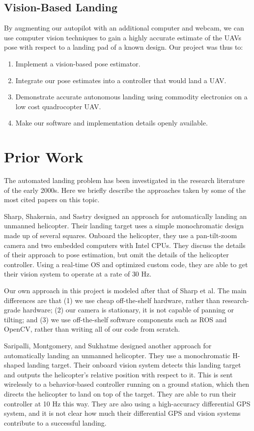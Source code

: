\documentclass[10pt]{scrartcl} %
\begin{document}
\subsection{Vision-Based Landing}
By augmenting our autopilot with an additional computer and webcam, we can use computer vision techniques to gain a highly accurate estimate of the UAVs pose with respect to a landing pad of a known design.
Our project was thus to:
\begin{enumerate}
\item{Implement a vision-based pose estimator.}
\item{Integrate our pose estimates into a controller that would land a UAV.}
\item{Demonstrate accurate autonomous landing using commodity electronics on a low cost quadrocopter UAV.}
\item{Make our software and implementation details openly available.}
\end{enumerate}

\section{Prior Work}

The automated landing problem has been investigated in the research literature
of the early 2000s. Here we briefly describe the approaches taken by some of
the most cited papers on this topic.

Sharp, Shakernia, and Sastry \cite{sharp_et_al_2001} designed an approach for
automatically landing an unmanned helicopter. Their landing target uses a
simple monochromatic design made up of several squares. Onboard the helicopter,
they use a pan-tilt-zoom camera and two embedded computers with Intel CPUs.
They discuss the details of their approach to pose estimation, but omit the
details of the helicopter controller. Using a real-time OS and optimized custom
code, they are able to get their vision system to operate at a rate of 30 Hz.

Our own approach in this project is modeled after that of Sharp et al. The main
differences are that (1) we use cheap off-the-shelf hardware, rather than
research-grade hardware; (2) our camera is stationary, it is not capable of
panning or tilting; and (3) we use off-the-shelf software components such as
ROS and OpenCV, rather than writing all of our code from scratch.

Saripalli, Montgomery, and Sukhatme \cite{saripalli_et_al_2002} designed
another approach for automatically landing an unmanned helicopter. They use a
monochromatic H-shaped landing target. Their onboard vision system detects this
landing target and outputs the helicopter's relative position with respect to
it. This is sent wirelessly to a behavior-based controller running on a ground
station, which then directs the helicopter to land on top of the target. They
are able to run their controller at 10 Hz this way. They are also using a
high-accuracy differential GPS system, and it is not clear how much their
differential GPS and vision systems contribute to a successful landing.
\end{document}
